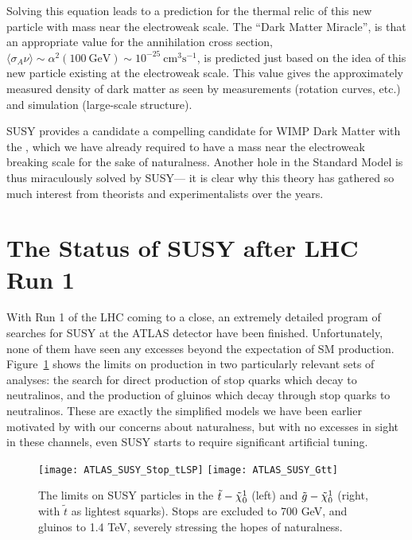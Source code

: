 Solving this equation leads to a prediction for the thermal relic of this new particle with mass near the electroweak scale. The ``Dark Matter Miracle'', is that an appropriate value for the annihilation cross section, $\langle \sigma_A \nu \rangle \sim \alpha^2 (100~\mathrm{GeV})\sim 10^{-25}~\mathrm{cm}^3\mathrm{s}^{-1}$, is predicted just based on the idea of this new particle existing at the electroweak scale. This value gives the approximately measured density of dark matter as seen by measurements (rotation curves, etc.) and simulation (large-scale structure). 

SUSY provides a candidate a compelling candidate for WIMP Dark Matter with the \lsp, which we have already required to have a mass near the electroweak breaking scale for the sake of naturalness. Another hole in the Standard Model is thus miraculously solved by SUSY--- it is clear why this theory has gathered so much interest from theorists and experimentalists over the years.

\section{The Status of SUSY after LHC Run 1}
\label{chapter:susy:status}


With Run 1 of the LHC coming to a close, an extremely detailed program  of searches for SUSY at the ATLAS detector have been finished. Unfortunately, none of them have seen any excesses beyond the expectation of SM production. Figure~\ref{fig:susy:limits} shows the limits on production in two particularly relevant sets of analyses: the search for direct production of stop quarks which decay to neutralinos, and the production of gluinos which decay through stop quarks to neutralinos. These are exactly the simplified models we have been earlier motivated by with our concerns about naturalness, but with no excesses in sight in these channels, even SUSY starts to require significant artificial tuning.


\begin{figure}[htbp]
  \centering
    \texttt{[image: ATLAS\_SUSY\_Stop\_tLSP]}
    \texttt{[image: ATLAS\_SUSY\_Gtt]}
  \caption{The limits on SUSY particles in the $\tilde{t}-\tilde{\chi}_0^1$ (left) and $\tilde{g}-\tilde{\chi}_0^1$ (right, with $\tilde{t}$ as lightest squarks). Stops are excluded to 700 GeV, and gluinos to 1.4 TeV, severely stressing the hopes of naturalness.}
  \label{fig:susy:limits}
\end{figure}


